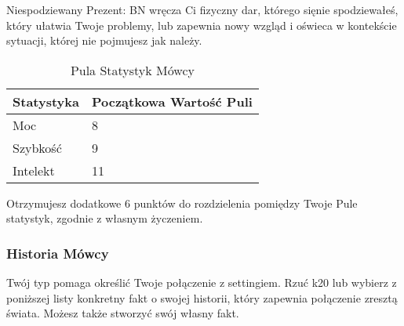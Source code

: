 Niespodziewany Prezent: BN wręcza Ci fizyczny dar, którego sięnie spodziewałeś, który ułatwia Twoje problemy, lub zapewnia nowy wzgląd i oświeca w kontekście sytuacji, której nie pojmujesz jak należy.

\begin{table*}[t]
 \centering
 \begin{tabularx}{\textwidth}{ | X | X  |}
  \hline
    \textbf{Statystyka} & \textbf{Początkowa Wartość Puli} \\ \hline
    Moc & 8  \\ \hline
    Szybkość & 9  \\ \hline
    Intelekt & 11  \\ \hline
 \end{tabularx}
  \caption {Pula Statystyk Mówcy}
  \label {Pula Statystyk Mówcy}
 \end{table*}
 
Otrzymujesz dodatkowe 6 punktów do rozdzielenia pomiędzy Twoje Pule statystyk, zgodnie z własnym życzeniem.
 
\subsubsection{Historia Mówcy}

Twój typ pomaga określić Twoje połączenie z settingiem. Rzuć k20 lub wybierz z poniższej listy konkretny fakt o swojej historii, który zapewnia połączenie zresztą świata. Możesz także stworzyć swój własny fakt.

